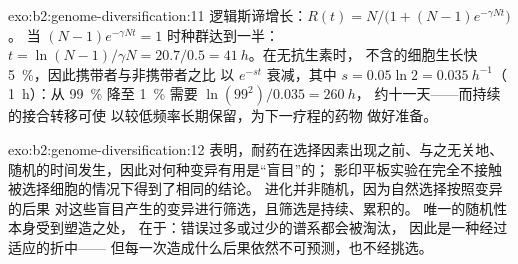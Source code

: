 \begin{solution}{exo:b2:genome-diversification:11}
逻辑斯谛增长：$R(t) = N/\bigl(1 + (N - 1)e^{-\gamma Nt}\bigr)$。
当 $(N - 1)e^{-\gamma Nt} = 1$ 时种群达到一半：$t = \ln(N -
1)/\gamma N = 20.7/0.5 = \qty{41}{h}$。在无抗生素时，
不含的细胞生长快 \qty{5}{\%}，因此携带者与非携带者之比
以 $e^{-st}$ 衰减，其中 $s = 0.05\ln 2 =
\qty{0.035}{h^{-1}}$（ \qty{1}{h}）：从 \qty{99}{\%} 降至
\qty{1}{\%} 需要 $\ln(99^2)/0.035 = \qty{260}{h}$，
约十一天——而持续的接合转移可使
以较低频率长期保留，为下一疗程的药物
做好准备。
\end{solution}

\begin{solution}{exo:b2:genome-diversification:12}
表明，耐药在选择因素出现之前、与之无关地、
随机的时间发生，因此对何种变异有用是“盲目”的；
影印平板实验在完全不接触被选择细胞的情况下得到了相同的结论。
进化并非随机，因为自然选择按照变异的后果
对这些盲目产生的变异进行筛选，且筛选是持续、累积的。
唯一的随机性本身受到塑造之处，
在于：错误过多或过少的谱系都会被淘汰，
因此是一种经过适应的折中——
但每一次造成什么后果依然不可预测，也不经挑选。
\end{solution}

